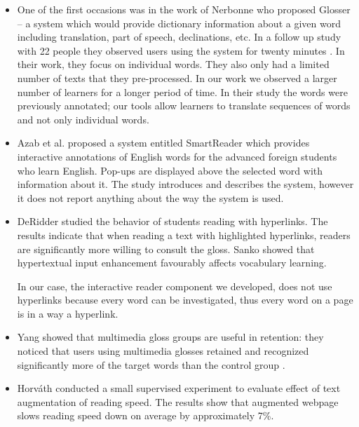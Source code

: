 \begin{itemize}


	\item  One of the first occasions was in the work of Nerbonne \cite{Nerb99-Assistant} who proposed Glosser -- a system which would provide dictionary information about a given word including translation, part of speech, declinations, etc. 
	In a follow up study with 22 people they observed users using the system for twenty minutes \cite{Dokter98-UserStudy}. 
	In their work, they focus on individual words. 
	They also only had a limited number of texts that they pre-processed.
	In our work we observed a larger number of learners for a longer period of time.
	In their study the words were previously annotated; our tools allow learners to translate sequences of words and not only individual words. 

	\item Azab et al. \cite{Azab13-nlp} proposed a system entitled SmartReader which provides interactive annotations of English words for the advanced foreign students who learn English. 
	Pop-ups are displayed above the selected word with information about it. 
	The study introduces and describes the system, however it does not report anything about the way the system is used.


	\item DeRidder \cite{DeRidder02-Links} studied the behavior of students reading with hyperlinks. The results indicate that when reading a text with highlighted hyperlinks, readers are significantly more willing to consult the gloss. Sanko \cite{Sanko06-Effects} showed that hypertextual input enhancement favourably affects vocabulary learning.

	In our case, the interactive reader component we developed, does not use hyperlinks because every word can be investigated, thus every word on a page is in a way a hyperlink. 


	\item Yang showed that multimedia gloss groups are useful in retention: they noticed that users using multimedia glosses retained and recognized significantly more of the target words than the control group \cite{Yang09-Glosses}.




	\item Horv\'ath conducted a small supervised experiment to evaluate effect of text
	augmentation of reading speed. The results show that augmented webpage slows
	reading speed down on average by approximately 7\%. \cite{Horva13-Enriching} 


\end{itemize}



